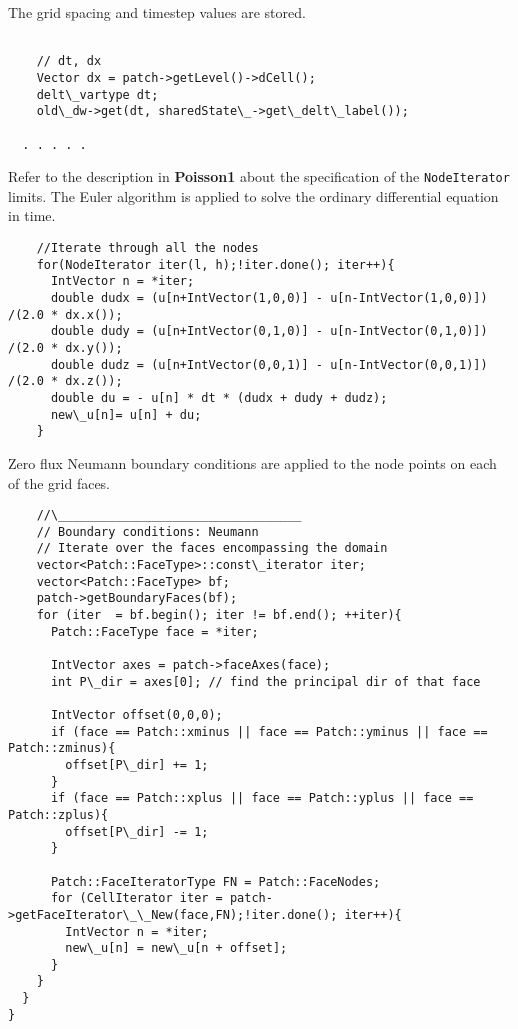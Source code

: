 \documentclass[12pt]{report}
\begin{document}
The grid spacing and timestep values are stored.

\begin{verbatim}

    // dt, dx
    Vector dx = patch->getLevel()->dCell();
    delt\_vartype dt;
    old\_dw->get(dt, sharedState\_->get\_delt\_label());
    
  . . . . .  
\end{verbatim}

Refer to the description in \textbf{Poisson1} about the specification
of the \texttt{NodeIterator} limits.  The Euler algorithm is applied to solve
the ordinary differential equation in time.

\begin{verbatim}                   
    //Iterate through all the nodes
    for(NodeIterator iter(l, h);!iter.done(); iter++){    
      IntVector n = *iter;
      double dudx = (u[n+IntVector(1,0,0)] - u[n-IntVector(1,0,0)]) /(2.0 * dx.x());
      double dudy = (u[n+IntVector(0,1,0)] - u[n-IntVector(0,1,0)]) /(2.0 * dx.y());
      double dudz = (u[n+IntVector(0,0,1)] - u[n-IntVector(0,0,1)]) /(2.0 * dx.z());
      double du = - u[n] * dt * (dudx + dudy + dudz);
      new\_u[n]= u[n] + du;
    }

\end{verbatim}

Zero flux Neumann boundary conditions are applied to the node points
on each of the grid faces.


\begin{verbatim}
    //\__________________________________
    // Boundary conditions: Neumann
    // Iterate over the faces encompassing the domain
    vector<Patch::FaceType>::const\_iterator iter;
    vector<Patch::FaceType> bf;
    patch->getBoundaryFaces(bf);
    for (iter  = bf.begin(); iter != bf.end(); ++iter){
      Patch::FaceType face = *iter;

      IntVector axes = patch->faceAxes(face);
      int P\_dir = axes[0]; // find the principal dir of that face

      IntVector offset(0,0,0);
      if (face == Patch::xminus || face == Patch::yminus || face == Patch::zminus){
        offset[P\_dir] += 1; 
      }
      if (face == Patch::xplus || face == Patch::yplus || face == Patch::zplus){
        offset[P\_dir] -= 1;
      }

      Patch::FaceIteratorType FN = Patch::FaceNodes;
      for (CellIterator iter = patch->getFaceIterator\_\_New(face,FN);!iter.done(); iter++){
        IntVector n = *iter;
        new\_u[n] = new\_u[n + offset];
      }
    }
  }
}

\end{verbatim}
\end{document}
